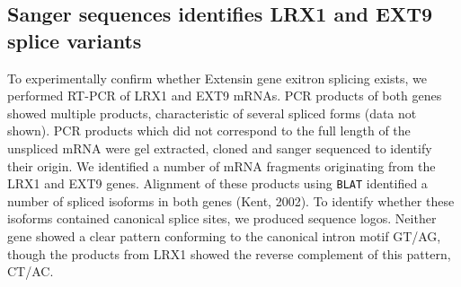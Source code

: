 \documentclass[12pt,a4paper,]{report}
\begin{document}
\newpage

\hypertarget{sanger-sequences-identifies-lrx1-and-ext9-splice-variants}{%
\subsection{Sanger sequences identifies LRX1 and EXT9 splice
variants}\label{sanger-sequences-identifies-lrx1-and-ext9-splice-variants}}

\label{ssec:extensin_sanger}

To experimentally confirm whether Extensin gene exitron splicing exists,
we performed RT-PCR of LRX1 and EXT9 mRNAs. PCR products of both genes
showed multiple products, characteristic of several spliced forms (data
not shown). PCR products which did not correspond to the full length of
the unspliced mRNA were gel extracted, cloned and sanger sequenced to
identify their origin. We identified a number of mRNA fragments
originating from the LRX1 and EXT9 genes. Alignment of these products
using \texttt{BLAT} identified a number of spliced isoforms in both
genes (Kent, 2002). To identify whether these isoforms contained
canonical splice sites, we produced sequence logos. Neither gene showed
a clear pattern conforming to the canonical intron motif GT/AG, though
the products from LRX1 showed the reverse complement of this pattern,
CT/AC.

\newpage
\end{document}
